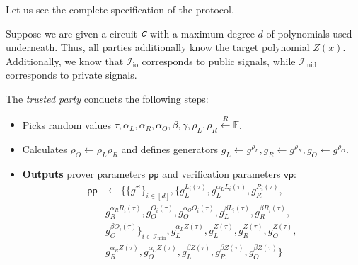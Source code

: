\documentclass[../lecture-notes.tex]{subfiles}
\begin{document}
Let us see the complete specification of the protocol.

\begin{tcolorbox}[breakable, title=Pinocchio Protocol,
    colback=blue!5!white,
    colframe=blue!75!black,
    colbacktitle=blue!25!white,
    coltitle=blue!20!black,
    fonttitle=\bfseries,
    boxrule=1.25pt,
    subtitle style={boxrule=0pt,
    colback=blue!20!white,
    colupper=blue!75!gray} ]
    \small
    Suppose we are given a circuit $\textit{\texttt{C}}$ with a maximum degree $d$ of polynomials used underneath. Thus, all parties additionally know the target polynomial $Z(x)$. Additionally, we know that $\mathcal{I}_{\text{io}}$ corresponds to public signals, while $\mathcal{I}_{\text{mid}}$ corresponds to private signals.

    The \emph{trusted party} conducts the following steps:
    \begin{itemize}[label=, left=0mm]
        \item Picks random values $\tau, \alpha_L, \alpha_R, \alpha_O, \beta, \gamma, \rho_L, \rho_R \xleftarrow{R} \mathbb{F}$.
        \item Calculates $\rho_O \gets \rho_L\rho_R$ and defines generators $g_L \gets g^{\rho_L}, g_R \gets g^{\rho_R}, g_O \gets g^{\rho_O}$.
        \item \textbf{Outputs} prover parameters $\mathsf{pp}$ and verification parameters $\mathsf{vp}$:
        \vspace{-1mm}
        \begin{equation*}
            \begin{aligned}                
                \mathsf{pp} &\gets \big\{\{g^{\tau^i}\}_{i \in [d]}, \{g_L^{L_i(\tau)}, g_L^{\alpha_LL_i(\tau)}, g_R^{R_i(\tau)}, \\
                            & g_R^{\alpha_RR_i(\tau)}, g_O^{O_i(\tau)}, g_O^{\alpha_O O_i(\tau)}, g_L^{\beta L_i(\tau)}, g_R^{\beta R_i(\tau)}, \\ 
                            & g_O^{\beta O_i(\tau)}\}_{i \in \mathcal{I}_{\text{mid}}}, g_L^{\alpha_L Z(\tau)}, g_L^{Z(\tau)}, g_R^{Z(\tau)}, g_O^{Z(\tau)}, \\ 
                            & g_R^{\alpha_R Z(\tau)}, g_O^{\alpha_O Z(\tau)}, g_L^{\beta Z(\tau)}, g_R^{\beta Z(\tau)}, g_O^{\beta Z(\tau)}\big\} \\
            \end{aligned}
        \end{equation*}
        \begin{equation*}

\end{equation*}
\end{itemize}
\end{tcolorbox}
\end{document}
